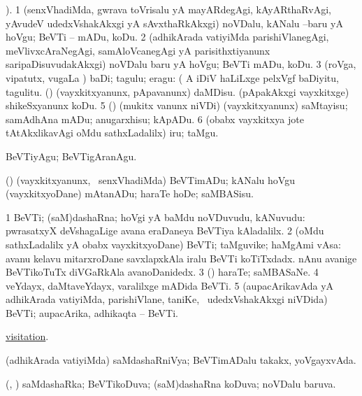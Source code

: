 \bentry
{} 
\gl{\sakirx}
). \bmng
\bnum
\num{1} (senxVhadiMda, gwrava toVrisalu yA mayARdegAgi, kAyARthaRvAgi, yAvudeV udedxVshakAkxgi yA sAvxthaRkAkxgi) noVDalu, kANalu --baru yA hoVgu; BeVTi -- mADu, koDu. 
\num{2} (adhikArada vatiyiMda parishiVlanegAgi, meVlivxcAraNegAgi, samAloVcanegAgi yA parisithxtiyanunx saripaDisuvudakAkxgi) noVDalu baru yA hoVgu; BeVTi mADu, koDu. 
\num{3} (roVga, vipatutx, \mo vugaLa \vi) baDi; tagulu; eragu:  (  A iDiV haLiLxge pelxVgf baDiyitu, tagulitu. 
 (\beY) 
\banum
{} (vayxkitxyanunx, pApavanunx) daMDisu. 
 (pApakAkxgi vayxkitxge) shikeSxyanunx koDu. 
\eanum
\numie
\num{5} (\pArxparx) (mukitx \mo vanunx niVDi) (vayxkitxyanunx) saMtayisu; samAdhAna mADu; anugarxhisu; kApADu. 
\num{6} (obabx vayxkitxya jote tAtAkxlikavAgi oMdu sathxLadalilx) iru; taMgu. 
\enum
\emng

\noindent 
\gl{\akirx}
\expl{}
\bmng
BeVTiyAgu; BeVTigAranAgu. 
\emng

\noindent 
\gl{\pagu}
\expl{}
\bmng
\banum
{} (\ame) (vayxkitxyanunx, \kanmu\ senxVhadiMda) BeVTimADu; kANalu hoVgu 
 (vayxkitxyoDane) mAtanADu; haraTe hoDe; saMBASisu. 
\eanum
\emng
\eentry

\bentry
{} 
\gl{\nA}
\expl{}
\bmng
\bnum
\num{1} BeVTi; (saM)dashaRna; hoVgi yA baMdu noVDuvudu, kANuvudu:  pwrasatxyX deVshagaLige avana eraDaneya BeVTiya kAladalilx. 
\num{2} (oMdu sathxLadalilx yA obabx vayxkitxyoDane) BeVTi; taMguvike; haMgAmi vAsa:  avanu kelavu mitarxroDane savxlapxkAla iralu BeVTi koTiTxdadx.  nAnu avanige BeVTikoTuTx diVGaRkAla avanoDanidedx. 
\num{3} (\ame) haraTe; saMBASaNe. 
\num{4} veYdayx, daMtaveYdayx, \mo varalilxge mADida BeVTi. 
\num{5} (aupacArikavAda yA adhikArada vatiyiMda, parishiVlane, taniKe, \mo\ udedxVshakAkxgi niVDida) BeVTi; aupacArika, adhikaqta -- BeVTi. 
\enum
\emng

\noindent 
\gl{\pagu}
\expl{}
\bmng
  \hyperlink{visitation pagu(2)}{visitation}. 
\emng
\eentry

\bentry
{} 
 \gl{\gu} \bmng
 (adhikArada vatiyiMda) saMdashaRniVya; BeVTimADalu takakx, yoVgayxvAda. 
\emng
\eentry

\bentry
{} 
\gl{\gu}
\expl{}
\bmng
 (\pArxparx, \kAparx) saMdashaRka; BeVTikoDuva; (saM)dashaRna koDuva; noVDalu baruva. 
\emng
\eentry

